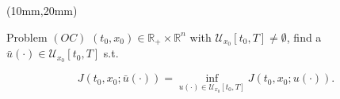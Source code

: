 \begin{frame}[plain]
	\begin{textblock*}{110mm}(10mm,20mm)
		\begin{graybox}{Problem $(OC)$}
			$(t_0,x_0)\in \mathbb{R}_{+}\times \mathbb{R}^n$ with $\mathcal{U}_{x_0}[t_0,T]\neq\emptyset$, find a $\bar{u}(\cdot)\in \mathcal{U}_{x_0}[t_0,T]$ s.t.
			
			\begin{equation*}
				J(t_0,x_0;\bar{u}(\cdot))=\inf_{u(\cdot)\in \mathcal{U}_{x_0}[t_0,T]} J(t_0,x_0;u(\cdot)).
			\end{equation*}
		\end{graybox}
	\end{textblock*}
\end{frame}
